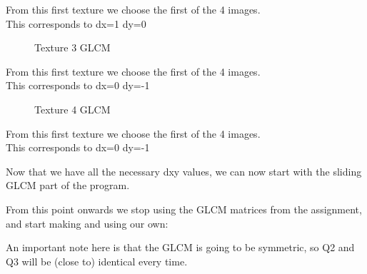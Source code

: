 \documentclass{article}
\begin{document}
	From this first texture we choose the first of the 4 images.\\
	This corresponds to dx=1 dy=0  

	\begin{figure}[h]%
		\centering
    	\caption{Texture 3 GLCM}%
    	\label{fig:o1_f3}%
	\end{figure}

	From this first texture we choose the first of the 4 images.\\
	This corresponds to dx=0 dy=-1  
\newpage
	\begin{figure}[h]%
		\centering
    	\caption{Texture 4 GLCM}%
    	\label{fig:o1_f4}%
	\end{figure}

	From this first texture we choose the first of the 4 images.\\
	This corresponds to dx=0 dy=-1

	
	
	Now that we have all the necessary dxy values, we can now start with the sliding GLCM part of the program. 

\newpage
From this point onwards we stop using the GLCM matrices from the assignment, and start making and using our own:

An important note here is that the GLCM is going to be symmetric, so Q2 and Q3 will be (close to) identical every time.
\end{document}
